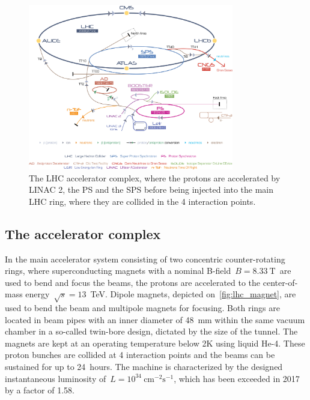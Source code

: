 \begin{figure}
\begin{centering}
\includegraphics[width=0.8\textwidth]{figures/exp/accelerators.jpg}
\caption[The LHC accelerator complex]{The LHC accelerator complex, where the protons are accelerated by LINAC 2, the PS and the SPS before being injected into the main LHC ring, where they are collided in the 4 interaction points.}
\label{fig:lhc_accelerators}
\end{centering}
\end{figure}

\subsection{The accelerator complex}
In the main accelerator system consisting of two concentric counter-rotating rings, where superconducting magnets with a nominal B-field~$B=8.33~\mathrm{T}$~are used to bend and focus the beams, the protons are accelerated to the center-of-mass energy~$\sqrt{s} = 13$~TeV. Dipole magnets, depicted on~\cref{fig:lhc_magnet}, are used to bend the beam and multipole magnets for focusing. Both rings are located in beam pipes with an inner diameter of 48~mm within the same vacuum chamber in a so-called twin-bore design, dictated by the size of the tunnel. The magnets are kept at an operating temperature below 2K using liquid He-4. These proton bunches are collided at 4 interaction points and the beams can be sustained for up to 24~hours. The machine is characterized by the designed instantaneous luminosity of~$L=10^{34}~\mathrm{cm}^{-2}\mathrm{s}^{-1}$, which has been exceeded in 2017 by a factor of 1.58.

